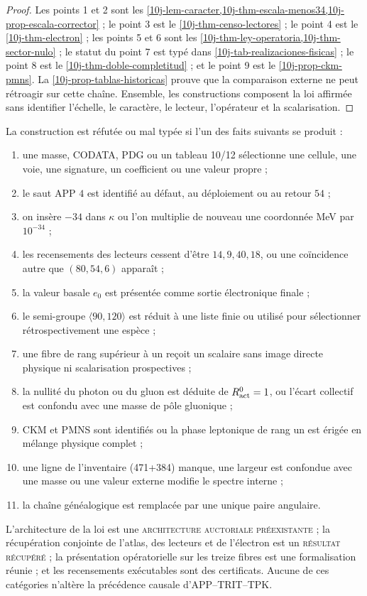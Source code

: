 \begin{proof}
Les points 1 et 2 sont les \cref{10j-lem-caracter,10j-thm-escala-menos34,10j-prop-escala-corrector} ; le point 3 est le \cref{10j-thm-censo-lectores} ; le point 4 est le \cref{10j-thm-electron} ; les points 5 et 6 sont les \cref{10j-thm-ley-operatoria,10j-thm-sector-nulo} ; le statut du point 7 est typé dans \cref{10j-tab-realizaciones-fisicas} ; le point 8 est le \cref{10j-thm-doble-completitud} ; et le point 9 est le \cref{10j-prop-ckm-pmns}. La \cref{10j-prop-tablas-historicas} prouve que la comparaison externe ne peut rétroagir sur cette chaîne. Ensemble, les constructions composent la loi affirmée sans identifier l'échelle, le caractère, le lecteur, l'opérateur et la scalarisation.
\end{proof}

\begin{falsifier}
\label{10j-falsador-ley-masas}
La construction est réfutée ou mal typée si l'un des faits suivants se produit :
\begin{enumerate}
 \item une masse, CODATA, PDG ou un tableau 10/12 sélectionne une cellule, une voie, une signature, un coefficient ou une valeur propre ;
 \item le saut APP \(4\) est identifié au défaut, au déploiement ou au retour \(54\) ;
 \item on insère \(-34\) dans \(\kappa\) ou l'on multiplie de nouveau une coordonnée MeV par \(10^{-34}\) ;
 \item les recensements des lecteurs cessent d'être \(14,9,40,18\), ou une coïncidence autre que \((80,54,6)\) apparaît ;
 \item la valeur basale \(e_0\) est présentée comme sortie électronique finale ;
 \item le semi-groupe \(\langle90,120\rangle\) est réduit à une liste finie ou utilisé pour sélectionner rétrospectivement une espèce ;
 \item une fibre de rang supérieur à un reçoit un scalaire sans image directe physique ni scalarisation prospectives ;
 \item la nullité du photon ou du gluon est déduite de \(R_{\rm act}^{0}=1\), ou l'écart collectif est confondu avec une masse de pôle gluonique ;
 \item CKM et PMNS sont identifiés ou la phase leptonique de rang un est érigée en mélange physique complet ;
 \item une ligne de l'inventaire (471+384) manque, une largeur est confondue avec une masse ou une valeur externe modifie le spectre interne ;
 \item la chaîne généalogique est remplacée par une unique paire angulaire.
\end{enumerate}
\end{falsifier}

L'architecture de la loi est une \textsc{architecture auctoriale préexistante} ; la récupération conjointe de l'atlas, des lecteurs et de l'électron est un \textsc{résultat récupéré} ; la présentation opératorielle sur les treize fibres est une formalisation réunie ; et les recensements exécutables sont des certificats. Aucune de ces catégories n'altère la précédence causale d'APP--TRIT--TPK.
